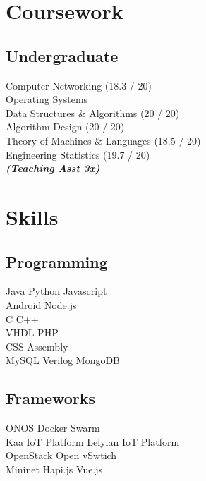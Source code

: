 \documentclass[]{deedy-resume-openfont}
\begin{document}
\begin{minipage}[t]{0.33\textwidth}

\section{Coursework}
\subsection{Undergraduate}
Computer Networking (18.3 / 20)\\
Operating Systems \\
Data Structures \& Algorithms (20 / 20)\\
Algorithm Design (20 / 20)\\
Theory of Machines \& Languages (18.5 / 20)\\
Engineering Statistics (19.7 / 20)\\
{\footnotesize \textit{\textbf{(Teaching Asst 3x) }}} \\


\section{Skills}
\subsection{Programming}
Java \textbullet{}  Python \textbullet{} Javascript \\
Android \textbullet{}  Node.js  \\
 C \textbullet{} C++ \\
VHDL \textbullet{}  PHP \\


CSS \textbullet{} Assembly \\
MySQL \textbullet{} Verilog \textbullet{} MongoDB \\

\sectionsep

\subsection{Frameworks}
ONOS \textbullet{} Docker \textbullet{} Swarm \\
Kaa IoT Platform \textbullet{} Lelylan IoT Platform \textbullet{} \\
OpenStack \textbullet{} Open vSwtich \textbullet{} \\
Mininet \textbullet{} Hapi.js \textbullet{} Vue.js
\sectionsep


\end{minipage}
\end{document}

